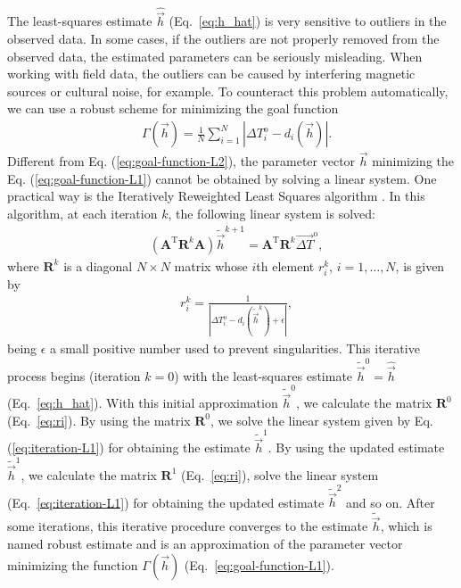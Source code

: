 \documentclass[journal abbreviation, npg]{copernicus}
\begin{document}
The least-squares estimate $\hat{\vec{h}}$ (Eq.~\ref{eq:h_hat}) is very
sensitive to outliers in the observed data. In some cases, if the outliers
are not properly removed from the observed data, the estimated parameters can
be seriously misleading. When working with field data, the outliers can be
caused by interfering magnetic sources or cultural noise, for example. To
counteract this problem automatically, we can use a robust scheme for
minimizing the goal function
\begin{align}
 &
\Gamma(\vec{h}) = \frac{1}{N} \sum_{i = 1}^{N}
\left\vert \Delta T^\mathrm{o}_{i} - d_{i}(\vec{h}) \right\vert .
\label{eq:goal-function-L1}
\end{align}
Different from Eq. (\ref{eq:goal-function-L2}), the parameter vector
$\vec{h}$ minimizing the Eq. (\ref{eq:goal-function-L1}) cannot be
obtained by solving a linear system. One practical way is the
Iteratively Reweighted Least Squares algorithm \citep{scales_1988,aster-etal2005}. In this algorithm, at each iteration $k$, the
following linear system is solved:
\begin{align}
 &
(\mathbf{A}^{\mathrm{T}} \mathbf{R}^{k} \mathbf{A} ) \tilde{\vec{h}}^{k+1} =
\mathbf{A}^{\mathrm{T}} \mathbf{R}^{k} \vec{\Delta T}^\mathrm{o} ,
\label{eq:iteration-L1}
\end{align}
where $\mathbf{R}^{k}$ is a diagonal $N \times N$ matrix whose $i$th
element $r_{i}^{k}$, $i = 1, \ldots, N$, is given by
\begin{align}
 &
r_{i}^{k} = \frac{1}{\left\vert \Delta T^\mathrm{o}_{i} - d_{i}\left(\tilde{\vec{h}}^{k}\right) + \epsilon \right\vert} ,
\label{eq:ri}
\end{align}
being $\epsilon$ a small positive number used to prevent singularities. This
iterative process begins (iteration $k = 0$) with the least-squares estimate
$\tilde{\vec{h}}^{0} = \hat{\vec{h}}$ (Eq.~\ref{eq:h_hat}). With this initial
approximation $\tilde{\vec{h}}^{0}$, we calculate the matrix $\mathbf{R}^{0}$
(Eq.~\ref{eq:ri}). By using the matrix $\mathbf{R}^{0}$, we solve the linear
system given by Eq. (\ref{eq:iteration-L1}) for obtaining the estimate
$\tilde{\vec{h}}^{1}$. By using the updated estimate $\tilde{\vec{h}}^{1}$,
we calculate the matrix $\mathbf{R}^{1}$ (Eq.~\ref{eq:ri}), solve the linear
system (Eq.~\ref{eq:iteration-L1}) for obtaining the updated estimate
$\tilde{\vec{h}}^{2}$ and so on. After some iterations, this iterative
procedure converges to the estimate $\tilde{\vec{h}}$, which is named robust
estimate and is an approximation of the parameter vector minimizing the
function $\Gamma(\vec{h})$ (Eq.~\ref{eq:goal-function-L1}).
\end{document}
